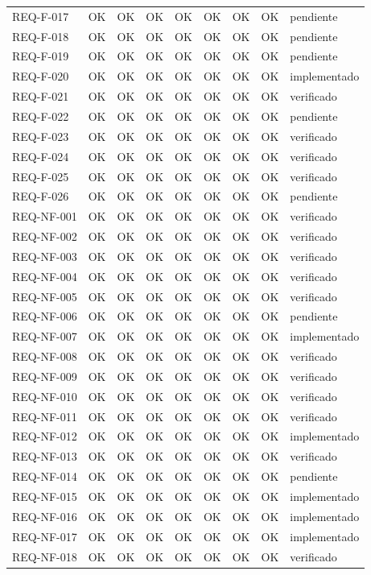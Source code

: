 \documentclass[
  spanish,
]{article}
\begin{document}
{\begin{longtable}[]{@{}lllllllll@{}}
REQ-F-017 & OK & OK & OK & OK & OK & OK & OK & pendiente \\
REQ-F-018 & OK & OK & OK & OK & OK & OK & OK & pendiente \\
REQ-F-019 & OK & OK & OK & OK & OK & OK & OK & pendiente \\
REQ-F-020 & OK & OK & OK & OK & OK & OK & OK & implementado \\
REQ-F-021 & OK & OK & OK & OK & OK & OK & OK & verificado \\
REQ-F-022 & OK & OK & OK & OK & OK & OK & OK & pendiente \\
REQ-F-023 & OK & OK & OK & OK & OK & OK & OK & verificado \\
REQ-F-024 & OK & OK & OK & OK & OK & OK & OK & verificado \\
REQ-F-025 & OK & OK & OK & OK & OK & OK & OK & verificado \\
REQ-F-026 & OK & OK & OK & OK & OK & OK & OK & pendiente \\
REQ-NF-001 & OK & OK & OK & OK & OK & OK & OK & verificado \\
REQ-NF-002 & OK & OK & OK & OK & OK & OK & OK & verificado \\
REQ-NF-003 & OK & OK & OK & OK & OK & OK & OK & verificado \\
REQ-NF-004 & OK & OK & OK & OK & OK & OK & OK & verificado \\
REQ-NF-005 & OK & OK & OK & OK & OK & OK & OK & verificado \\
REQ-NF-006 & OK & OK & OK & OK & OK & OK & OK & pendiente \\
REQ-NF-007 & OK & OK & OK & OK & OK & OK & OK & implementado \\
REQ-NF-008 & OK & OK & OK & OK & OK & OK & OK & verificado \\
REQ-NF-009 & OK & OK & OK & OK & OK & OK & OK & verificado \\
REQ-NF-010 & OK & OK & OK & OK & OK & OK & OK & verificado \\
REQ-NF-011 & OK & OK & OK & OK & OK & OK & OK & verificado \\
REQ-NF-012 & OK & OK & OK & OK & OK & OK & OK & implementado \\
REQ-NF-013 & OK & OK & OK & OK & OK & OK & OK & verificado \\
REQ-NF-014 & OK & OK & OK & OK & OK & OK & OK & pendiente \\
REQ-NF-015 & OK & OK & OK & OK & OK & OK & OK & implementado \\
REQ-NF-016 & OK & OK & OK & OK & OK & OK & OK & implementado \\
REQ-NF-017 & OK & OK & OK & OK & OK & OK & OK & implementado \\
REQ-NF-018 & OK & OK & OK & OK & OK & OK & OK & verificado \\
\end{longtable}
}
\end{document}
